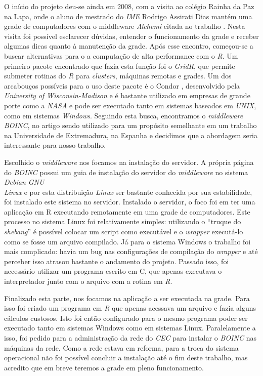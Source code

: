 
O início do projeto deu-se ainda em 2008, com a visita ao colégio Rainha da Paz na Lapa, onde o aluno de mestrado do \textit{IME}
Rodrigo Assirati Dias mantém uma grade de computadores com o middleware \textit{Alchemi} citada no trabalho %
. Nesta visita foi possível esclarecer dúvidas, entender o funcionamento da grade e receber algumas dicas quanto à manutenção da grade. 
Após esse encontro, começou-se a buscar alternativas para o a computação de alta performance com o \textit{R}. Um primeiro pacote encontrado
que fazia esta função foi o \textit{GridR}, que permite submeter rotinas do \textit{R} para \textit{clusters}, máquinas remotas e 
grades. Um dos arcabouços possíveis para o uso deste pacote é o Condor %
, desenvolvido pela \textit{University of Wisconsin-Madison} e é bastante utilizado em empresas
de grande porte como a \textit{NASA} e pode ser executado tanto em sistemas
baseados em \textit{UNIX}, como em sistemas \textit{Windows}. Seguindo esta busca, encontramos o 
\textit{middleware} \textit{BOINC}, no artigo %
sendo utilizado para um propósito semelhante em um trabalho na Universidade de Extremadura, na Espanha 
e decidimos que a abordagem seria interessante para nosso trabalho.

Escolhido o \textit{middleware} nos focamos na instalação do servidor. A própria página do \textit{BOINC} 
possui um guia de instalação do servidor do \textit{middleware} no sistema \textit{Debian GNU\\Linux} e por
esta distribuição \textit{Linux} ser bastante conhecida por sua estabilidade, foi instalado este sistema no servidor.
Instalado o servidor, o foco foi em ter uma aplicação em R executando remotamente em uma grade de computadores. 
Este processo no sistema Linux foi relativamente simples: utilizando o ``truque do \textit{shebang}'' é possível 
colocar um script como executável e o \textit{wrapper} executá-lo como se fosse um arquivo compilado. Já para
o sistema Windows %
o trabalho foi mais complicado: havia um bug nas configurações de compilação do \textit{wrapper} e até perceber isso
atrasou bastante o andamento do projeto. Passado isso, foi necessário utilizar um programa escrito em C, que apenas executava 
o interpretador junto com o arquivo com a rotina em \textit{R}.

Finalizado esta parte, nos focamos na aplicação a ser executada na grade. Para isso foi criado um programa em \textit{R} que
apenas acessava um arquivo e fazia alguns cálculos custosos. Isto foi então configurado para o mesmo programa poder
ser executado tanto em sistemas Windows como em sistemas Linux. Paralelamente a isso, foi pedido para a administração
da rede do \textit{CEC} para instalar o \textit{BOINC} nas máquinas da rede. Como a rede estava em reforma, para a troca
do sistema operacional não foi possível concluir a instalação até o fim deste trabalho, mas acredito que em breve teremos a grade em 
pleno funcionamento.


